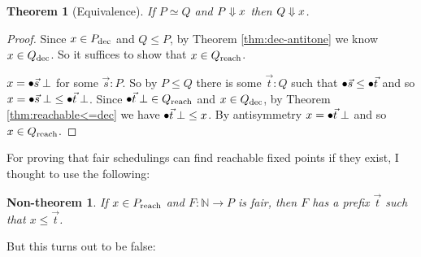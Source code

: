 \documentclass{article}
\newcommand{\fa}[1]{\forall\,{#1}.\ }
\newcommand{\N}{\mathbb{N}}
\newcommand{\todo}[1]{{\color{red}{#1}}}
\newtheorem{theorem}{Theorem}
\newtheorem{nontheorem}{Non-theorem}
\begin{document}
\todo{Couldn't I prove a perhaps more traditional ``confluence''-style theorem
  as well?}

\begin{theorem}[Equivalence]
  If $P \simeq Q$ and $P \Downarrow x$ then $Q \Downarrow x$.
  \label{thm:equivalence}
\end{theorem}

\begin{proof}
  Since $x \in {P}_{\text{dec}}$ and $Q \le P$, by Theorem \ref{thm:dec-antitone} we know
  $x \in {Q}_{\text{dec}}$. So it suffices to show that $x \in {Q}_{\text{reach}}$.

  $x = {\bullet\vec{s}}\;\bot$ for some $\vec{s} : P$. So by $P \le Q$ there is some
  $\vec{t} : Q$ such that ${\bullet\vec{s}} \le {\bullet\vec{t}}$ and so $x = {\bullet\vec{s}}\; \bot \le
  {\bullet\vec{t}}\;\bot$. Since ${\bullet\vec{t}}\;\bot \in {Q}_{\text{reach}}$ and $x \in {Q}_{\text{dec}}$, by
  Theorem \ref{thm:reachable<=dec} we have ${\bullet\vec{t}}\;\bot \le x$. By
  antisymmetry $x = {\bullet\vec{t}}\;\bot$ and so $x \in {Q}_{\text{reach}}$.
\end{proof}





For proving that fair schedulings can find reachable fixed points if they exist,
I thought to use the following:

\begin{nontheorem}
  If $x \in {P}_{\text{reach}}$ and $F : \N \to P$ is fair, then $F$ has a prefix
  $\vec{t}$ such that $x \le \vec{t}$.
\end{nontheorem}

But this turns out to be false:
\end{document}
